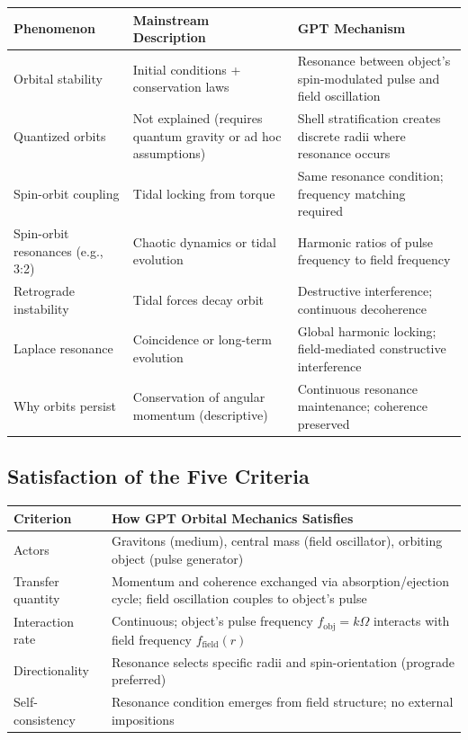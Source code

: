 \documentclass[12pt, a4paper]{article}
\begin{document}
\begin{center}
\begin{tabular}{|p{3.5cm}|p{5cm}|p{5cm}|}
\hline
\textbf{Phenomenon} & \textbf{Mainstream Description} & \textbf{GPT Mechanism} \\
\hline
Orbital stability & Initial conditions + conservation laws & Resonance between object's spin-modulated pulse and field oscillation \\
\hline
Quantized orbits & Not explained (requires quantum gravity or ad hoc assumptions) & Shell stratification creates discrete radii where resonance occurs \\
\hline
Spin-orbit coupling & Tidal locking from torque & Same resonance condition; frequency matching required \\
\hline
Spin-orbit resonances (e.g., 3:2) & Chaotic dynamics or tidal evolution & Harmonic ratios of pulse frequency to field frequency \\
\hline
Retrograde instability & Tidal forces decay orbit & Destructive interference; continuous decoherence \\
\hline
Laplace resonance & Coincidence or long-term evolution & Global harmonic locking; field-mediated constructive interference \\
\hline
Why orbits persist & Conservation of angular momentum (descriptive) & Continuous resonance maintenance; coherence preserved \\
\hline
\end{tabular}
\end{center}

\subsection{Satisfaction of the Five Criteria}
\label{subsec:orbital_criteria}

\begin{center}
\begin{tabular}{|p{3.5cm}|p{10cm}|}
\hline
\textbf{Criterion} & \textbf{How GPT Orbital Mechanics Satisfies} \\
\hline
Actors & Gravitons (medium), central mass (field oscillator), orbiting object (pulse generator) \\
\hline
Transfer quantity & Momentum and coherence exchanged via absorption/ejection cycle; field oscillation couples to object's pulse \\
\hline
Interaction rate & Continuous; object's pulse frequency \( f_{\text{obj}} = k\Omega \) interacts with field frequency \( f_{\text{field}}(r) \) \\
\hline
Directionality & Resonance selects specific radii and spin-orientation (prograde preferred) \\
\hline
Self-consistency & Resonance condition emerges from field structure; no external impositions \\
\hline
\end{tabular}
\end{center}
\end{document}
